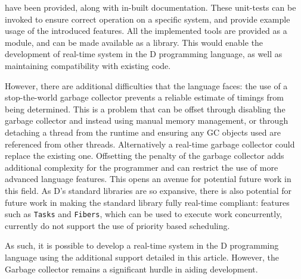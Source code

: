 have been provided, along with in-built documentation. 
These unit-tests can be invoked to ensure correct operation on a specific
system, and provide example usage of the introduced features. 
All the implemented tools are provided as a module, and can be made available as 
a library. This would enable the development of real-time system in the D programming 
language, as well as maintaining compatibility with existing code. 
\par\bigskip\noindent
However, there are additional difficulties that the 
language faces: the use of a stop-the-world garbage collector prevents a reliable 
estimate of timings from being determined. 
This is a problem that can be offset through disabling the garbage collector 
and instead using manual memory management, or through detaching a thread from the 
runtime and ensuring any GC objects used are referenced from other threads.
Alternatively a real-time garbage collector could replace the existing one. 
Offsetting the penalty of the garbage collector adds additional complexity for 
the programmer and can restrict the use of more advanced language features.
This opens an avenue for potential future work in this field. 
As D's standard libraries are so expansive, there is also potential for future
work in making the standard library fully real-time compliant: features such as
\texttt{Tasks} and \texttt{Fibers}, which can be used to execute work
concurrently, currently do not support the use of priority based scheduling. 
\par\bigskip\noindent
As such, it is possible to develop a real-time system in the D programming 
language using the additional support detailed in this article. However, 
the Garbage collector remains a significant hurdle in aiding development.
